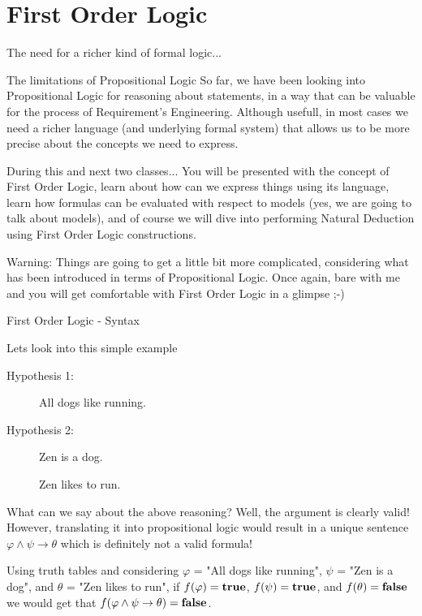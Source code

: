 \documentclass[aspectratio=169]{beamer}
\begin{document}
\frame[plain]{\titlepage}


\section{First Order Logic}

\begin{slide}{The need for a richer kind of formal logic...}
\small

\begin{block}{The limitations of Propositional Logic}
 So far, we have been looking into Propositional Logic for reasoning about statements, in a way that can be valuable for the process of Requirement's Engineering. Although usefull, in most cases we need a richer language (and underlying formal system) that allows us to be more precise about the concepts we need to express.
\end{block}

\begin{block}{During this and next two classes...}
You will be presented with the concept of First Order Logic, learn about how can we express things using its language, learn how formulas can be evaluated with respect to models (yes, we are going to talk about models), and of course we will dive into performing Natural Deduction using First Order Logic constructions.
\end{block}


\begin{alert}{Warning:}
Things are going to get a little bit more complicated, considering what has been introduced in terms of Propositional Logic. Once again, bare with me and you will get comfortable with First Order Logic in a glimpse ;-)
\end{alert}

\end{slide}


\begin{slide}{First Order Logic - Syntax}

\begin{block}{Lets look into this simple example}
\begin{description}
  \item [Hypothesis 1:] All dogs like running.
  \item [Hypothesis 2:] Zen is a dog.
  \item [\color{red}{Conclusion:}] Zen likes to run.
\end{description}
\end{block}

\begin{block}{What can we say about the above reasoning?}
Well, the argument is clearly valid! However, translating it into propositional logic would result in a unique sentence $\varphi \land \psi \to \theta$ which is definitely not a valid formula!

Using truth tables and considering $\varphi$ = "All dogs like running", $\psi$ = "Zen is a dog", and $\theta$ = "Zen likes to run", if $f(\varphi) = {\bf true}$, $f(\psi) = {\bf true}$, and $f(\theta) = {\bf false}$ we would get that $f(\varphi \land \psi \to \theta) = {\bf false}$.
\end{block}
\end{slide}
\end{document}
